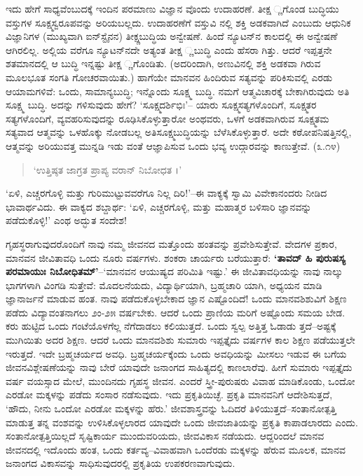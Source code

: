 ಇದು ಹೇಗೆ ಸಾಧ್ಯವೆಂಬುದಕ್ಕೆ ಇಂದಿನ ಪರಮಾಣು ವಿಜ್ಞಾನ ವೊಂದು ಉದಾಹರಣೆ. ತೀಕ್ಷ ್ಣಗೊಂಡ ಬುದ್ಧಿಯು ವಸ್ತುಗಳ ಸೂಕ್ಷ್ಮಸ್ವರೂಪವನ್ನು ಅರಿಯಬಲ್ಲದು. ಉದಾಹರಣೆಗೆ ವಸ್ತುವಿ ನಲ್ಲಿ ಶಕ್ತಿ ಅಡಕವಾಗಿದೆ ಎಂಬುದು ಆಧುನಿಕ ವಿಜ್ಞಾನಿಗಳ (ಮುಖ್ಯವಾಗಿ ಐನ್​ಸ್ಟೈನನ) ತೀಕ್ಷ್ಣಬುದ್ಧಿಯ ಅನ್ವೇಷಣೆ. ಹಿಂದೆ ನ್ಯೂಟನ್​ನ ಕಾಲದಲ್ಲಿ ಈ ಅನ್ವೇಷಣೆ ಆಗಿರಲಿಲ್ಲ. ಅಲ್ಲಿಯ ವರೆಗೂ ನ್ಯೂಟನ್​ನದೇ ಅತ್ಯಂತ ತೀಕ್ಷ ್ಣಬುದ್ಧಿ ಎಂದು ಹೆಸರಾ ಗಿತ್ತು. ಆದರೆ ಇಪ್ಪತ್ತನೇ ಶತಮಾನದಲ್ಲಿ ಆ ಬುದ್ಧಿ ಇನ್ನಷ್ಟು ತೀಕ್ಷ ್ಣಗೊಂಡಿತು. (ಅದರಿಂದಾಗಿ, ಅಣುವಿನಲ್ಲಿ ಶಕ್ತಿ ಅಡಕವಾ ಗಿರುವ ಮೂಲಭೂತ ಸಂಗತಿ ಗೋಚರವಾಯಿತು.) ಹಾಗೆಯೇ ಮಾನವನ ಹಿಂದಿರುವ ಸತ್ಯವನ್ನು ಪರಿಕಿಸುವಲ್ಲಿ ಎರಡು ಆಯಾಮಗಳಿವೆ: ಒಂದು, ಸಾಮಾನ್ಯಬುದ್ಧಿ; ಇನ್ನೊಂದು ಸೂಕ್ಷ್ಮ ಬುದ್ಧಿ. ನಮಗೆ ಆತ್ಮವಿಚಾರಕ್ಕೆ ಬೇಕಾಗಿರುವುದು ಅತಿ ಸೂಕ್ಷ್ಮ ಬುದ್ಧಿ. ಅದನ್ನು ಗಳಿಸುವುದು ಹೇಗೆ? ‘ಸೂಕ್ಷ್ಮದರ್ಶಿಭಿಃ’– ಯಾರು ಸೂಕ್ಷ್ಮಸತ್ಯಗಳೊಂದಿಗೆ, ಸೂಕ್ಷ್ಮತರ ಸತ್ಯಗಳೊಂದಿಗೆ, ವ್ಯವಹರಿಸುವುದನ್ನು ರೂಢಿಸಿಕೊಳ್ಳುತ್ತಾರೋ ಅಂಥವರು, ಒಳಗೆ ಅಡಕವಾಗಿರುವ ಸೂಕ್ಷ್ಮತಮ ಸತ್ಯವಾದ ಆತ್ಮವನ್ನು ಒಳಹೊಕ್ಕು ನೋಡಬಲ್ಲ ಅತಿಸೂಕ್ಷ್ಮಬುದ್ಧಿಯನ್ನು ಬೆಳೆಸಿಕೊಳ್ಳುತ್ತಾರೆ. ಅದೇ ಕಠೋಪನಿಷತ್ತಿನಲ್ಲಿ, ಆತ್ಮವನ್ನು ಅರಿಯುವತ್ತ ಮುನ್ನಡಿ ಇಡು ವಂತೆ ಆಜ್ಞಾಪಿಸುವ ಒಂದು ಭವ್ಯ ಉದ್ಗಾರವನ್ನು ಕಾಣುತ್ತೇವೆ. (೩.೧೪)

\begin{verse}
‘ಉತ್ತಿಷ್ಠತ ಜಾಗ್ರತ ಪ್ರಾಪ್ಯ ವರಾನ್ ನಿಬೋಧತ ।’
\end{verse}

‘ಏಳಿ, ಎಚ್ಚರಗೊಳ್ಳಿ ಮತ್ತು ಗುರಿಮುಟ್ಟುವವರೆಗೂ ನಿಲ್ಲ ದಿರಿ!’–ಈ ವಾಕ್ಯಕ್ಕೆ ಸ್ವಾಮಿ ವಿವೇಕಾನಂದರು ನೀಡಿದ ಭಾವಾರ್ಥವಿದು. ಈ ವಾಕ್ಯದ ಶಬ್ದಾರ್ಥ: ‘ಏಳಿ, ಎಚ್ಚರಗೊಳ್ಳಿ, ಮತ್ತು ಮಹಾತ್ಮರ ಬಳಿಸಾರಿ ಜ್ಞಾನವನ್ನು ಪಡೆದುಕೊಳ್ಳಿ!’ ಎಂಥ ಅದ್ಭುತ ಸಂದೇಶ!

ಗೃಹಸ್ಥರಾಗುವುದರೊಂದಿಗೆ ನಾವು ನಮ್ಮ ಜೀವನದ ಮತ್ತೊಂದು ಹಂತವನ್ನು ಪ್ರವೇಶಿಸುತ್ತೇವೆ. ವೇದಗಳ ಪ್ರಕಾರ, ಮಾನವನ ಜೀವಿತಾವಧಿ ಒಂದು ನೂರು ವರ್ಷಗಳು. ಶಂಕರಾ ಚಾರ್ಯರು ಬರೆಯುತ್ತಾರೆ: \textbf{‘ತಾವದ್ ಹಿ ಪುರುಷಸ್ಯ ಪರಮಾಯುಃ ನಿಬೋಧಿತಮ್​’}–‘ಮಾನವನ ಆಯುಷ್ಯದ ಪರಿಮಿತಿ ಇಷ್ಟು.’ ಈ ಜೀವಿತಾವಧಿಯನ್ನು ನಾವು ನಾಲ್ಕು ಭಾಗಗಳಾಗಿ ವಿಂಗಡಿ ಸುತ್ತೇವೆ: ಮೊದಲನೆಯದು, ವಿದ್ಯಾರ್ಥಿಯಾಗಿ, ಬ್ರಹ್ಮಚಾರಿ ಯಾಗಿ, ಅಧ್ಯಯನ ಮಾಡಿ ಜ್ಞಾನಾರ್ಜನೆ ಮಾಡುವ ಹಂತ. ನಾವು ಪಡೆದುಕೊಳ್ಳಬೇಕಾದ ಜ್ಞಾನ ಎಷ್ಟೊಂದಿದೆ! ಒಂದು ಮಾನವಶಿಶುವಿಗೆ ಶಿಕ್ಷಣ ಪಡೆದು ವಿದ್ಯಾವಂತನಾಗಲು ೨ಂ-೨೫ ವರ್ಷಬೇಕು. ಆದರೆ ಒಂದು ಪ್ರಾಣಿಯ ಮರಿಗೆ ಅಷ್ಟೊಂದು ಸಮಯ ಬೇಡ. ಕರು ಹುಟ್ಟಿದ ಒಂದು ಗಂಟೆಯೊಳಗೆಲ್ಲ ನೆಗೆದಾಡಲು ಕಲಿಯುತ್ತದೆ. ಒಂದು ಸ್ವಲ್ಪ ಅತ್ತಿತ್ತ ಓಡಾಡು ತ್ತದೆ–ಅಷ್ಟಕ್ಕೆ ಮುಗಿಯಿತು ಅದರ ಶಿಕ್ಷಣ. ಆದರೆ ಒಂದು ಮಾನವಶಿಶು ಸುಮಾರು ಇಪ್ಪತ್ತೈದು ವರ್ಷಗಳ ಕಾಲ ಶಿಕ್ಷಣ ಪಡೆಯುತ್ತಲೇ ಇರುತ್ತದೆ. ಇದೇ ಬ್ರಹ್ಮಚರ್ಯದ ಅವಧಿ. ಬ್ರಹ್ಮಚರ್ಯಕ್ಕೆಂದು ಒಂದು ಅವಧಿಯನ್ನು ಮೀಸಲು ಇಡುವ ಈ ಬಗೆಯ ಜೀವನವಿಶ್ಲೇಷಣೆಯನ್ನು ನಾವು ಬೇರೆ ಯಾವುದೇ ಜನಾಂಗದ ಸಾಹಿತ್ಯದಲ್ಲಿ ಕಾಣಲಾರೆವು. ಹೀಗೆ ಸುಮಾರು ಇಪ್ಪತ್ತೈದು ವರ್ಷ ವಯಸ್ಸಾದ ಮೇಲೆ, ಮುಂದಿನದು ಗೃಹಸ್ಥ ಜೀವನ. ಎಂದರೆ ಸ್ತ್ರೀ-ಪುರುಷರು ವಿವಾಹ ಮಾಡಿಕೊಂಡು, ಒಂದೋ ಎರಡೋ ಮಕ್ಕಳನ್ನು ಪಡೆದು ಸಂಸಾರ ನಡೆಸುವುದು. ಇದು ಪ್ರಕೃತಿಯಿಚ್ಛೆ. ಪ್ರಕೃತಿ ಮಾನವನಿಗೆ ಆದೇಶಿಸುತ್ತದೆ, ‘ಹೌದು, ನೀನು ಒಂದೋ ಎರಡೋ ಮಕ್ಕಳನ್ನು ಹೆರು.’ ಜೀವಶಾಸ್ತ್ರವನ್ನು ಓದಿದರೆ ತಿಳಿಯುತ್ತದೆ–ಸಂತಾನೋತ್ಪತ್ತಿ ಮಾಡುತ್ತ ತನ್ನ ವಂಶವನ್ನು ಉಳಿಸಿಕೊಳ್ಳಲಾರದ ಯಾವುದೇ ಒಂದು ಜೀವಜಾತಿಯನ್ನು ಪ್ರಕೃತಿ ಕಾಪಾಡಲಾರದು ಎಂದು. ಸಂತಾನೋತ್ಪತ್ತಿಯಿಲ್ಲದೆ ಸೃಷ್ಟಿಕಾರ್ಯ ಮುಂದುವರಿಯದು, ಜೀವವಿಕಾಸ ನಡೆಯದು. ಆದ್ದರಿಂದಲೆ ಮಾನವ ಜೀವನದಲ್ಲಿ ಇದೊಂದು ಹಂತ, ಒಂದು ಕರ್ತವ್ಯ–ವಿವಾಹವಾಗಿ ಒಂದೆರಡು ಮಕ್ಕಳನ್ನು ಹೆರುವ ಮೂಲಕ, ಮಾನವ ಜನಾಂಗದ ವಿಕಾಸವನ್ನು ಸಾಧಿಸುವುದರಲ್ಲಿ ಪ್ರಕೃತಿಯ ಉಪಕರಣವಾಗುವುದು. 

